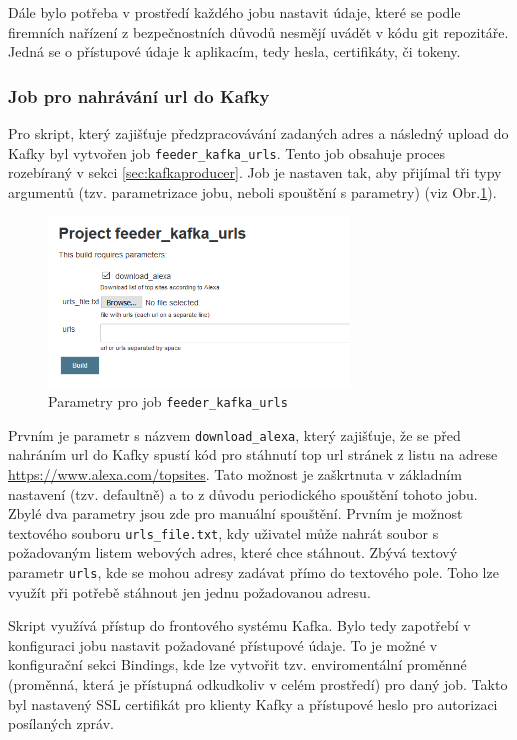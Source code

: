 \documentclass[thesis=M,czech,hidelinks]{FITthesis}[2013/05/06]
\begin{document}
Dále bylo potřeba v prostředí každého jobu nastavit údaje, které se podle firemních nařízení z bezpečnostních důvodů nesmějí uvádět v kódu git repozitáře. Jedná se o přístupové údaje k aplikacím, tedy hesla, certifikáty, či tokeny.


\subsubsection{Job pro nahrávání url do Kafky}
Pro skript, který zajišťuje předzpracovávání zadaných adres a následný upload do Kafky byl vytvořen job \texttt{feeder_kafka_urls}. Tento job obsahuje proces rozebíraný v sekci \ref{sec:kafkaproducer}. Job je nastaven tak, aby přijímal tři typy argumentů (tzv. parametrizace jobu, neboli spouštění s parametry) (viz Obr.\ref{fig:kafka_feed}). 

\begin{figure}[h]
	\centering
	\includegraphics[width=8cm]{pictures/jenkins_kafka_feed.png}
	\caption{Parametry pro job \texttt{feeder_kafka_urls}}
	\label{fig:kafka_feed}
\end{figure}

Prvním je parametr s názvem \texttt{download_alexa}, který zajišťuje, že se před nahráním url do Kafky spustí kód pro stáhnutí top url stránek z listu na adrese \url{https://www.alexa.com/topsites}. Tato možnost je zaškrtnuta v základním nastavení (tzv. defaultně) a to z důvodu periodického spouštění tohoto jobu. Zbylé dva parametry jsou zde pro manuální spouštění. Prvním je možnost textového souboru \texttt{urls_file.txt}, kdy uživatel může nahrát soubor s požadovaným listem webových adres, které chce stáhnout. Zbývá textový parametr \texttt{urls}, kde se mohou adresy zadávat přímo do textového pole. Toho lze využít při potřebě stáhnout jen jednu požadovanou adresu. 

Skript využívá přístup do frontového systému Kafka. Bylo tedy zapotřebí v konfiguraci jobu nastavit požadované přístupové údaje. To je možné v konfigurační sekci Bindings, kde lze vytvořit tzv. enviromentální proměnné (proměnná, která je přístupná odkudkoliv v celém prostředí) pro daný job. Takto byl nastavený SSL certifikát pro klienty Kafky a přístupové heslo pro autorizaci posílaných zpráv.
\end{document}
